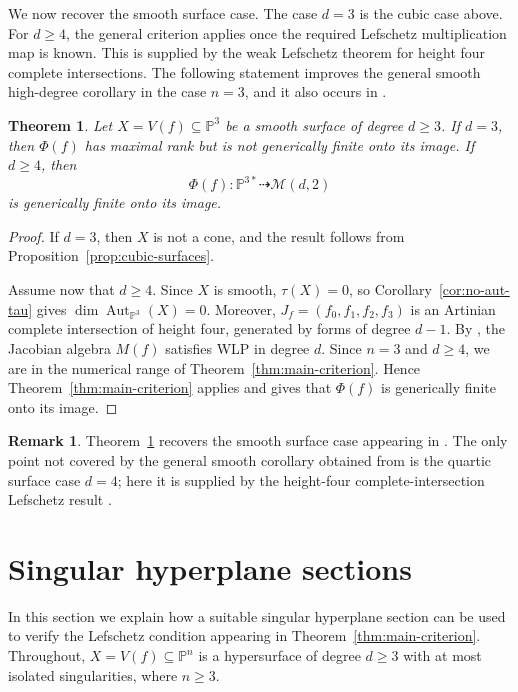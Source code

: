 \documentclass[11pt]{amsart}
\theoremstyle{plain}
\newtheorem{thm}[subsection]{Theorem}
\theoremstyle{definition}
\newtheorem{rk}[subsection]{Remark}
\numberwithin{equation}{section}
\newcommand{\M}{{\mathcal M}}
\newcommand{\PP}{\mathbb{P}}
\DeclareMathOperator{\Aut}{Aut}
\begin{document}
We now recover the smooth surface case. The case $d=3$ is the cubic case above.
For $d\geq4$, the general criterion applies once the required Lefschetz
multiplication map is known. This is supplied by the weak Lefschetz theorem for
height four complete intersections. The following statement improves the general
smooth high-degree corollary in the case $n=3$, and it also occurs in
\cite[Corollary~1, 2)]{B2}.

\begin{thm}
\label{thm:smooth-surfaces}
Let $X=V(f)\subseteq\PP^3$ be a smooth surface of degree $d\geq3$. If $d=3$,
then $\Phi(f)$ has maximal rank but is not generically finite onto its image. If
$d\geq4$, then
\[
\Phi(f):\PP^{3*}\dashrightarrow \M(d,2)
\]
is generically finite onto its image.
\end{thm}

\begin{proof}
If $d=3$, then $X$ is not a cone, and the result follows from
Proposition~\ref{prop:cubic-surfaces}.

Assume now that $d\geq4$. Since $X$ is smooth, $\tau(X)=0$, so
Corollary~\ref{cor:no-aut-tau} gives $\dim\Aut_{\PP^3}(X)=0$. Moreover,
$J_f=(f_0,f_1,f_2,f_3)$ is an Artinian complete intersection of height four,
generated by forms of degree $d-1$. By \cite[Corollary~7.3]{B+}, the Jacobian
algebra $M(f)$ satisfies WLP in degree $d$. Since $n=3$ and $d\geq4$, we are in
the numerical range of Theorem~\ref{thm:main-criterion}. Hence
Theorem~\ref{thm:main-criterion} applies and gives that $\Phi(f)$ is generically
finite onto its image.
\end{proof}

\begin{rk}
\label{rk:smooth-surface-comparison}
Theorem~\ref{thm:smooth-surfaces} recovers the smooth surface case appearing in
\cite[Corollary~1, 2)]{B2}. The only point not covered by the general smooth
corollary obtained from \cite[Theorem~4.5]{BM} is the quartic surface case
$d=4$; here it is supplied by the height-four complete-intersection Lefschetz
result \cite[Corollary~7.3]{B+}.
\end{rk}
\section{Singular hyperplane sections}
\label{sec:singular-hyperplane-sections}

In this section we explain how a suitable singular hyperplane section can be used
to verify the Lefschetz condition appearing in Theorem~\ref{thm:main-criterion}.
Throughout, $X=V(f)\subseteq\PP^n$ is a hypersurface of degree $d\geq3$ with at
most isolated singularities, where $n\geq3$.
\end{document}
